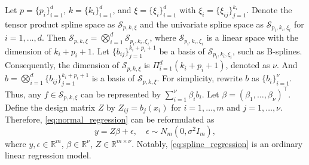 Let $p=\{p_i\}_{i=1}^d$, $k=\{k_i\}_{i=1}^d$, and $\xi=\{\xi_i\}_{i=1}^d$ with $\xi_i=\{\xi_{ij}\}_{j=1}^{k_i}$. Denote the tensor product spline space as $\mathcal{S}_{p,k,\xi}$ and the univariate spline space as $\mathcal{S}_{p_i,k_i,\xi_i}$ for $i=1,\ldots,d$. Then $\mathcal{S}_{p,k,\xi}=\bigotimes_{i=1}^d \mathcal{S}_{p_i,k_i,\xi_i}$, where $\mathcal{S}_{p_i,k_i,\xi_i}$ is a linear space with the dimension of $k_i+p_i+1$. Let $\{b_{ij}\}_{j=1}^{k_i+p_i+1}$ be a basis of $\mathcal{S}_{p_i,k_i,\xi_i}$, such as B-splines. Consequently, the dimension of $\mathcal{S}_{p,k,\xi}$ is $\Pi_{i=1}^d (k_i+p_i+1)$, denoted as $\nu$. And $b=\bigotimes_{i=1}^d \{b_{ij}\}_{j=1}^{k_i+p_i+1}$ is a basis of $\mathcal{S}_{p,k,\xi}$. For simplicity, rewrite $b$ as $\{b_i\}_{i=1}^\nu$. Thus, any $f\in \mathcal{S}_{p,k,\xi}$ can be represented by $\sum_{i=1}^\nu \beta_i b_i$. Let $\beta=(\beta_1,\ldots,\beta_\nu)^\top$. Define the design matrix $Z$ by $Z_{ij}=b_j(x_i)$ for $i=1,\ldots,m$ and $j=1,\ldots,\nu$. Therefore, \eqref{eq:normal_regression} can be reformulated as
\begin{equation}
    \label{eq:spline_regression}
    y = Z\beta + \epsilon,\quad \epsilon\sim N_m(0,\sigma^2 I_m),
\end{equation}
where $y,\epsilon \in \mathbb{R}^m$, $\beta\in \mathbb{R}^\nu$, $Z\in \mathbb{R}^{m\times \nu}$. Notably, \eqref{eq:spline_regression} is an ordinary linear regression model.

